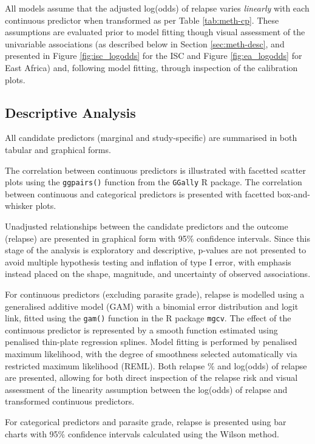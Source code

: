 All models assume that the adjusted log(odds) of relapse varies \textit{linearly} with each continuous predictor when transformed as per Table \ref{tab:meth-cp}. These assumptions are evaluated prior to model fitting though visual assessment of the univariable associations (as described below in Section \ref{sec:meth-desc}, and presented in Figure \ref{fig:isc_logodds} for the ISC and Figure \ref{fig:ea_logodds} for East Africa) and, following model fitting, through inspection of the calibration plots.

\subsection{\label{sec:meth-desc}Descriptive Analysis}

All candidate predictors (marginal and study-specific) are summarised in both tabular and graphical forms.

The correlation between continuous predictors is illustrated with facetted scatter plots using the \texttt{ggpairs()} function from the \texttt{GGally} R package\cite{GGally2025}. The correlation between continuous and categorical predictors is presented with facetted box-and-whisker plots.

Unadjusted relationships between the candidate predictors and the outcome (relapse) are presented in graphical form with 95\% confidence intervals. Since this stage of the analysis is exploratory and descriptive, p-values are not presented to avoid multiple hypothesis testing and inflation of type I error, with emphasis instead placed on the shape, magnitude, and uncertainty of observed associations\cite{altman1986}.

For continuous predictors (excluding parasite grade), relapse is modelled using a generalised additive model (GAM) with a binomial error distribution and logit link, fitted using the \texttt{gam()} function in the R package \texttt{mgcv}\cite{wood2011}. The effect of the continuous predictor is represented by a smooth function estimated using penalised thin-plate regression splines. Model fitting is performed by penalised maximum likelihood, with the degree of smoothness selected automatically via restricted maximum likelihood (REML). Both relapse \% and log(odds) of relapse are presented, allowing for both direct inspection of the relapse risk and visual assessment of the linearity assumption between the log(odds) of relapse and transformed continuous predictors.

For categorical predictors and parasite grade, relapse is presented using bar charts with 95\% confidence intervals calculated using the Wilson method\cite{wilson1927}.

